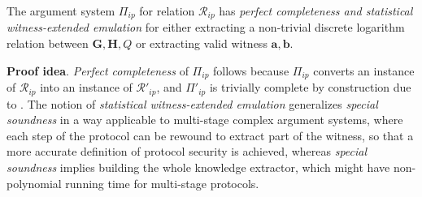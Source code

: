\documentclass[../lecture-notes-148x210.tex]{subfiles}
\begin{document}
\begin{theorem}
    The argument system $\Pi_{ip}$ for relation $\mathcal{R}_{ip}$ has \textit{perfect completeness and statistical witness-extended emulation} for either extracting a non-trivial discrete logarithm relation between $\mathbf{G,H}, Q$ or extracting valid witness $\mathbf{a,b}$.
\end{theorem}

\textbf{Proof idea}. \textit{Perfect completeness} of $\Pi_{ip}$ follows because $\Pi_{ip}$ converts an instance of $\mathcal{R}_{ip}$ into an instance of $\mathcal{R}'_{ip}$, and $\Pi'_{ip}$ is trivially complete by construction due to . The notion of \textit{statistical witness-extended emulation} generalizes \textit{special soundness} in a way applicable to multi-stage complex argument systems, where each step of the protocol can be rewound to extract part of the witness, so that a more accurate definition of protocol security is achieved, whereas \textit{special soundness} implies building the whole knowledge extractor, which might have non-polynomial running time for multi-stage protocols.
\end{document}
